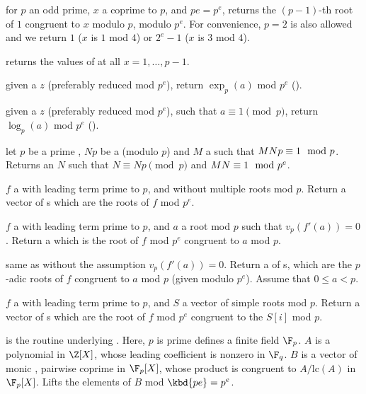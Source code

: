 for $p$ an odd prime,
$x$ a  coprime to $p$, and $pe = p^e$, returns the $(p-1)$-th root of
$1$ congruent to $x$ modulo $p$, modulo $p^e$. For convenience, $p = 2$ is
also allowed and we return $1$ ($x$ is $1$ mod $4$) or $2^e - 1$ ($x$ is $3$
mod $4$).

 returns the values of
 at all $x = 1, \dots, p-1$.

 given a  $z$ (preferably
reduced mod $p^e$), return $\exp_p(a)$ mod $p^e$ ().

 given a  $z$ (preferably
reduced mod $p^e$), such that $a \equiv 1 \pmod{p}$, return
$\log_p(a)$ mod $p^e$ ().


 let
$p$ be a prime , $Np$ be a  (modulo $p$) and
$M$ a  such that $M\*Np \equiv 1 \mod p$.
Returns an  $N$ such that $N \equiv Np \pmod{p}$ and
$M\*N \equiv 1 \mod p^e$.


 $f$ a  with leading
term prime to $p$, and without multiple roots mod $p$. Return a vector
of s which are the roots of $f$ mod $p^e$.

 $f$ a  with
leading term prime to $p$, and $a$ a root mod $p$ such that
$v_p(f'(a))=0$.  Return a  which is the root of $f$ mod $p^e$
congruent to $a$ mod $p$.

 same as 
without the assumption $v_p(f'(a)) = 0$. Return a  of s,
which are the $p$-adic roots of $f$ congruent to $a$ mod $p$ (given modulo
$p^e$). Assume that $0 \leq a < p$.

 $f$ a  with
leading term prime to $p$, and $S$ a vector of simple roots mod $p$. Return a
vector of s which are the root of $f$ mod $p^e$ congruent to the
$S[i]$ mod $p$.

 is
the routine underlying . Here, $p$ is prime
defines a finite field $\F_p$. $A$ is a polynomial in
$\Z[X]$, whose leading coefficient is nonzero in $\F_q$. $B$ is a vector of
monic , pairwise coprime in $\F_p[X]$, whose product is congruent to
$A/\text{lc}(A)$ in $\F_p[X]$. Lifts the elements of $B$ mod $\kbd{pe} = p^e$.

